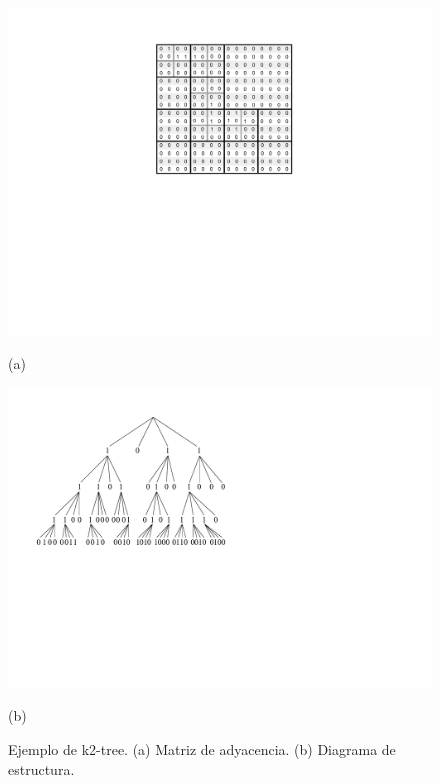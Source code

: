 \begin{figure}%
    	\centering
    	\begin{minipage}{0.45\textwidth}
    		\centering
    		\includegraphics[scale=.6, clip,  trim=270 280 250 0]{img/arte/k2-tree-matrix.pdf}
    		
    		(a)
    	\end{minipage}
    	\begin{minipage}{0.45\textwidth}
    		\centering
    		\includegraphics[scale=.5, clip, trim=50 280 410 0]{img/arte/graphs-k2tree.pdf}
    		
    		(b)
    	\end{minipage}

    \caption{Ejemplo de k2-tree. (a) Matriz de adyacencia. (b) Diagrama de estructura.}
    \label{fig:k2tree}
\end{figure}
